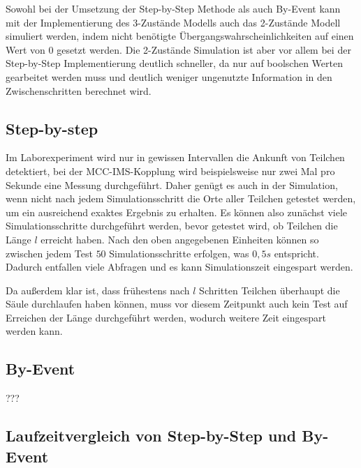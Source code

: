 Sowohl bei der Umsetzung der Step-by-Step Methode als auch By-Event kann mit der Implementierung des 3-Zustände Modells auch das 2-Zustände Modell simuliert werden, indem nicht benötigte Übergangswahrscheinlichkeiten auf einen Wert von $0$ gesetzt werden. Die 2-Zustände Simulation ist aber vor allem bei der Step-by-Step Implementierung deutlich schneller, da nur auf boolschen Werten gearbeitet werden muss und deutlich weniger ungenutzte Information in den Zwischenschritten berechnet wird.


\subsection{Step-by-step}

Im Laborexperiment wird nur in gewissen Intervallen die Ankunft von Teilchen detektiert, bei der MCC-IMS-Kopplung wird beispielsweise nur zwei Mal pro Sekunde eine Messung durchgeführt. Daher genügt es auch in der Simulation, wenn nicht nach jedem Simulationsschritt die Orte aller Teilchen getestet werden, um ein ausreichend exaktes Ergebnis zu erhalten.
Es können also zunächst viele Simulationsschritte durchgeführt werden, bevor getestet wird, ob Teilchen die Länge $l$ erreicht haben. Nach den oben angegebenen Einheiten können so zwischen jedem Test $50$ Simulationsschritte erfolgen, was $0,5 s$ entspricht. Dadurch entfallen viele Abfragen und es kann Simulationszeit eingespart werden. 

Da außerdem klar ist, dass frühestens nach $l$ Schritten Teilchen überhaupt die Säule durchlaufen haben können, muss vor diesem Zeitpunkt auch kein Test auf Erreichen der Länge durchgeführt werden, wodurch weitere Zeit eingespart werden kann.


\subsection{By-Event}
???

\subsection{Laufzeitvergleich von Step-by-Step und By-Event}

